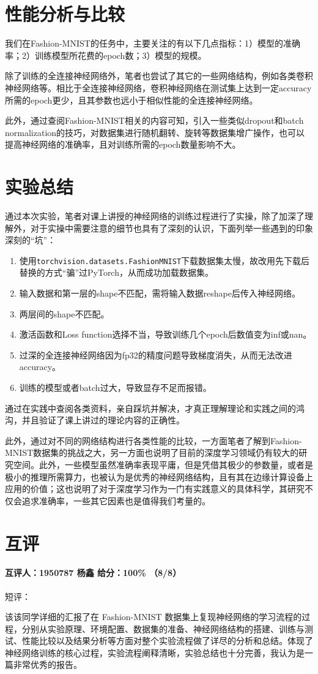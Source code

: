 \documentclass[cn,black,10pt,normal]{elegantnote}
\newcommand{\upcite}[1]{\textsuperscript{\textsuperscript{\cite{#1}}}}
\begin{document}
\section{性能分析与比较} 我们在Fashion-MNIST的任务中，主要关注的有以下几点指标：1）模型的准确率；2）训练模型所花费的epoch数；3）模型的规模。

除了训练的全连接神经网络外，笔者也尝试了其它的一些网络结构，例如各类卷积神经网络等。相比于全连接神经网络，卷积神经网络在测试集上达到一定accuracy所需的epoch更少，且其参数也远小于相似性能的全连接神经网络。

此外，通过查阅Fashion-MNIST相关的内容可知，引入一些类似dropout和batch normalization的技巧\upcite{fsmnistg}，对数据集进行随机翻转、旋转等数据集增广操作，也可以提高神经网络的准确率，且对训练所需的epoch数量影响不大。\upcite{meshkini2019analysis}

\section{实验总结} 通过本次实验，笔者对课上讲授的神经网络的训练过程进行了实操，除了加深了理解外，对于实操中需要注意的细节也具有了深刻的认识，下面列举一些遇到的印象深刻的“坑”：
\begin{enumerate}
    \item 使用\lstinline{torchvision.datasets.FashionMNIST}下载数据集太慢，故改用先下载后替换的方式“骗”过PyTorch，从而成功加载数据集。
    \item 输入数据和第一层的shape不匹配，需将输入数据reshape后传入神经网络。
    \item 两层间的shape不匹配。
    \item 激活函数和Loss function选择不当，导致训练几个epoch后数值变为inf或nan。
    \item 过深的全连接神经网络因为fp32的精度问题导致梯度消失，从而无法改进accuracy。
    \item 训练的模型或者batch过大，导致显存不足而报错。
\end{enumerate}
通过在实践中查阅各类资料，亲自踩坑并解决，才真正理解理论和实践之间的鸿沟，并且验证了课上讲过的理论内容的正确性。

此外，通过对不同的网络结构进行各类性能的比较，一方面笔者了解到Fashion-MNIST数据集的挑战之大，另一方面也说明了目前的深度学习领域仍有较大的研究空间。此外，一些模型虽然准确率表现平庸，但是凭借其极少的参数量，或者是极小的推理所需算力，也被认为是优秀的神经网络结构，且有其在边缘计算设备上应用的价值；这也说明了对于深度学习作为一门有实践意义的具体科学，其研究不仅会追求准确率，一些其它因素也是值得我们考量的。

{}

\section*{互评}

\paragraph{互评人：1950787\; 杨鑫\; 给分：100\% （8/8）} 短评：

该该同学详细的汇报了在 Fashion-MNIST 数据集上复现神经网络的学习流程的过程，分别从实验原理、环境配置、数据集的准备、神经网络结构的搭建、训练与测试、性能比较以及结果分析等方面对整个实验流程做了详尽的分析和总结。体现了神经网络训练的核心过程，实验流程阐释清晰，实验总结也十分完善，我认为是一篇非常优秀的报告。
\end{document}
